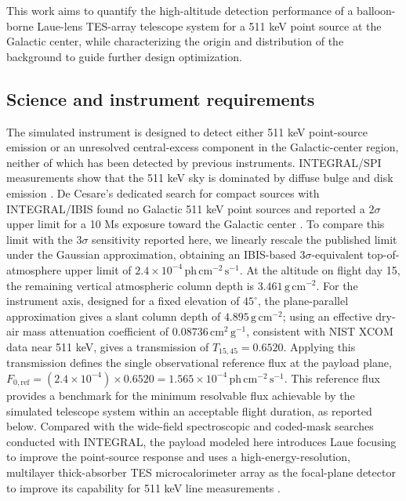 \documentclass[11pt]{article}
\newcommand{\phcms}{\ensuremath{\,\mathrm{ph\,cm^{-2}\,s^{-1}}}}
\begin{document}
This work aims to quantify the high-altitude detection performance of a
balloon-borne Laue-lens TES-array telescope system for a 511 keV point source at
the Galactic center, while characterizing the origin and distribution of the
background to guide further design optimization.

\subsection{Science and instrument requirements}
\label{sec:requirements}

\begingroup
{}

The simulated instrument is designed to detect either 511 keV point-source
emission or an unresolved central-excess component in the Galactic-center
region, neither of which has been detected by previous instruments.
INTEGRAL/SPI measurements show that the 511 keV sky is dominated by diffuse
bulge and disk emission \cite{Siegert2016AA,Yoneda2025}. De Cesare's dedicated
search for compact sources with INTEGRAL/IBIS found no Galactic 511 keV point
sources and reported a $2\sigma$ upper limit for a 10 Ms exposure toward the
Galactic center \cite{DeCesare2011}. To compare this limit with the $3\sigma$
sensitivity reported here, we linearly rescale the published limit under the
Gaussian approximation, obtaining an IBIS-based $3\sigma$-equivalent
top-of-atmosphere upper limit of $2.4\times10^{-4}\phcms$. At the altitude on
flight day 15, the remaining vertical atmospheric column depth is
$3.461\,\mathrm{g\,cm^{-2}}$. For the instrument axis, designed for a fixed
elevation of $45^\circ$, the plane-parallel approximation gives a slant column
depth of $4.895\,\mathrm{g\,cm^{-2}}$; using an effective dry-air mass
attenuation coefficient of $0.08736\,\mathrm{cm^2\,g^{-1}}$, consistent with NIST
XCOM data near 511 keV, gives a transmission of $T_{15,45}=0.6520$. Applying
this transmission defines the single observational reference flux at the
payload plane,
$F_{0,\mathrm{ref}}=(2.4\times10^{-4})\times0.6520=1.565\times10^{-4}\phcms$.
This reference flux provides a benchmark for the minimum resolvable flux
achievable by the simulated telescope system within an acceptable flight
duration, as reported below. Compared with the wide-field spectroscopic and
coded-mask searches conducted with INTEGRAL, the payload modeled here
introduces Laue focusing to improve the point-source response and uses a
high-energy-resolution, multilayer thick-absorber TES microcalorimeter array as
the focal-plane detector to improve its capability for 511 keV line
measurements \cite{Shirazi2023,Caputo2017}.
\end{document}
